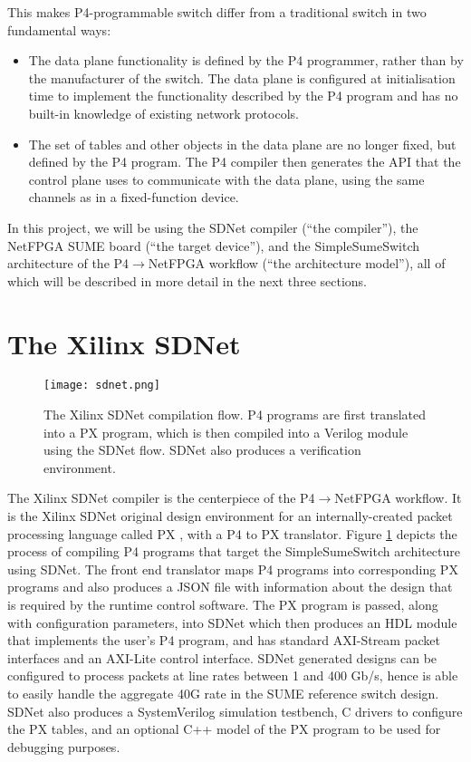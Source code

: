This makes P4-programmable switch differ from a traditional switch in two fundamental ways:
\begin{itemize}
	\item The data plane functionality is defined by the P4 programmer, rather than by the manufacturer of the switch. The data plane is configured at initialisation time to implement the functionality described by the P4 program and has no built-in knowledge of existing network protocols.
	\item The set of tables and other objects in the data plane are no longer fixed, but defined by the P4 program. The P4 compiler then generates the API that the control plane uses to communicate with the data plane, using the same channels as in a fixed-function device.
\end{itemize}

In this project, we will be using the SDNet compiler (``the compiler''), the NetFPGA SUME board (``the target device''), and the SimpleSumeSwitch architecture of the P4$\rightarrow$NetFPGA workflow (``the architecture model''), all of which will be described in more detail in the next three sections.

\section{The Xilinx SDNet}

\begin{figure}[!h]
	\centering
	\texttt{[image: sdnet.png]}
	\caption{The Xilinx SDNet compilation flow. P4 programs are first translated into a PX program, which is then compiled into a Verilog module using the SDNet flow. SDNet also produces a verification environment.}
	\label{sdnet}
\end{figure}

The Xilinx SDNet compiler is the centerpiece of the P4$\rightarrow$NetFPGA workflow. It is the Xilinx SDNet original design environment for an internally-created packet processing language called PX \cite{px}, with a P4 to PX translator. Figure \ref{sdnet} depicts the process of compiling P4 programs that target the SimpleSumeSwitch architecture using SDNet. The front end translator maps P4 programs into corresponding PX programs and also produces a JSON file with information about the design that is required by the runtime control software. The PX program is passed, along with configuration parameters, into SDNet which then produces an HDL module that implements the user’s P4 program, and has standard AXI-Stream packet interfaces and an AXI-Lite control interface. SDNet generated designs can be configured to process packets at line rates between 1 and 400 Gb/s, hence is able to easily handle the aggregate 40G rate in the SUME reference switch design. SDNet also produces a SystemVerilog simulation testbench, C drivers to configure the PX tables, and an optional C++ model of the PX program to be used for debugging purposes.

